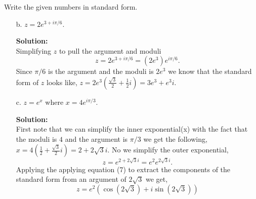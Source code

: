 \documentclass[12pt]{article}
\makeatletter
\theoremstyle{homework}
\newenvironment{exercise}[1]
{\def\@currentlabel{#1}\exercisecore}
{\endexercisecore}
\newcommand{\localhead}[1]{\par\smallskip\noindent\textbf{#1}\nobreak\\}%
\newcommand\solution{\localhead{Solution:}}
\makeatother
\begin{document}
\begin{exercise}{2} Write the given numbers in standard form.\\
    \begin{enumerate}
        \item[b.] $z = 2e^{3 + i\pi/6}$.
        \solution Simplifying $z$ to pull the argument and moduli
        \begin{equation*}
            z = 2e^{3 + i\pi/6} = (2e^3)e^{i\pi/6}.
        \end{equation*}
        Since $\pi/6$ is the argument and the moduli is $2e^3$ we know that the standard form of $z$ looks like, 
        $z = 2e^3(\frac{\sqrt{3}}{2} + \frac{1}{2}i) = 3e^3+ e^3i$.



        \item[c.] $z = e^x$ where $x = 4e^{i\pi/3}$.
        \solution First note that we can simplify the inner exponential(x) with the fact that the moduli is $4$ and the argument is 
        $\pi/3$ we get the following, $x = 4(\frac{1}{2} + \frac{\sqrt{3}}{2}i) = 2 + 2\sqrt{3}i$. No we simplify the outer exponential,
        \begin{equation*}
            z = e^{2 + 2\sqrt{3}i} =e^2e^{2\sqrt{3}i}.
        \end{equation*}
        Applying the applying equation (7) to extract the components of the standard form from an argument of $2\sqrt{3}$ we get, 
        \begin{equation*}
            z = e^2(\cos(2\sqrt{3}) + i \sin(2\sqrt{3}))
        \end{equation*}
    \end{enumerate}
    
\end{exercise}
\vspace{.15in}
\end{document}

